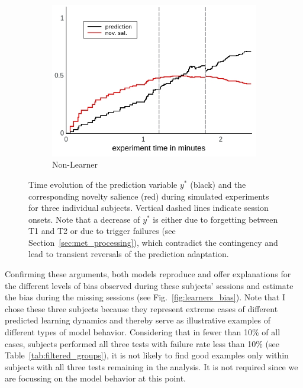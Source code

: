 \documentclass[a4paper]{scrreprt}
\begin{document}
\begin{figure}
    \begin{subfigure}[b]{0.49\textwidth}
        \includegraphics[width=\textwidth]{figs/sec3/nonlearner_mod1.jpeg}
        \caption{Non-Learner}
    \end{subfigure}
\caption{Time evolution of the prediction variable $y^*$ (black) and the corresponding novelty salience (red) during simulated experiments for three individual subjects. Vertical dashed lines indicate session onsets. Note that a decrease of $y^*$ is either due to forgetting between T1 and T2 or due to trigger failures (see Section~\ref{sec:met_processing}), which contradict the contingency and lead to transient reversals of the prediction adaptation.}
\label{fig:learners_pred}
\end{figure}

Confirming these arguments, both models reproduce and offer explanations for the different levels of bias observed during these subjects' sessions and estimate the bias during the missing sessions (see Fig.~\ref{fig:learners_bias}). Note that I chose these three subjects because they represent extreme cases of different predicted learning dynamics and thereby serve as illustrative examples of different types of model behavior. Considering that in fewer than 10\% of all cases, subjects performed all three tests with failure rate less than 10\% (see Table~\ref{tab:filtered_groups}), it is not likely to find good examples only within subjects with all three tests remaining in the analysis. It is not required since we are focussing on the model behavior at this point.
\end{document}
